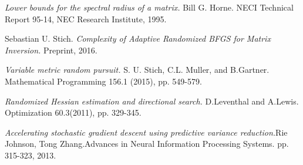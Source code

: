 \documentclass[12pt,conference,compsocconf]{IEEEtran}
\begin{document}
\begin{thebibliography}{1}
\textit{Lower bounds for the spectral radius of a matrix.} Bill G. Horne. NECI Technical Report 95-14, NEC Research Institute, 1995.

Sebastian U. Stich.
\textit{Complexity of Adaptive Randomized BFGS for Matrix Inversion.}
Preprint, 2016.

\textit{Variable metric random pursuit.} S. U. Stich, C.L. Muller, and B.Gartner. Mathematical
Programming 156.1 (2015), pp. 549-579.

\textit{Randomized Hessian estimation and directional search.} D.Leventhal and A.Lewis. Optimization 60.3(2011), pp. 329-345.

\textit{Accelerating stochastic gradient descent using predictive variance reduction.}Rie Johnson, Tong Zhang.Advances in Neural Information Processing Systems. pp. 315-323, 2013.

\end{thebibliography}
\end{document}
